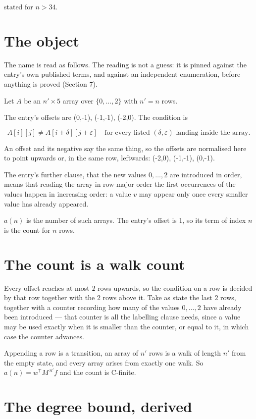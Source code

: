\documentclass[11pt]{article}
\theoremstyle{definition}
\begin{document}
stated for $n > 34$.

\section{The object}

The name is read as follows. The reading is not a guess: it is pinned against the entry's own published terms, and against an independent enumeration, before anything is proved (Section 7).

Let $A$ be an $n' \times 5$ array over $\{0,\dots,2\}$ with $n' = n$ rows.

The entry's offsets are (0,-1), (-1,-1), (-2,0). The condition is

\[A[i][j] \ne A[i{+}\delta][j{+}\varepsilon]\quad\text{for every listed }(\delta,\varepsilon)\text{ landing inside the array.}\]

An offset and its negative say the same thing, so the offsets are normalised here to point upwards or, in the same row, leftwards: (-2,0), (-1,-1), (0,-1).

The entry's further clause, that the new values $0,\dots,2$ are introduced in order, means that reading the array in row-major order the first occurrences of the values happen in increasing order: a value $v$ may appear only once every smaller value has already appeared.

$a(n)$ is the number of such arrays. The entry's offset is 1, so its term of index $n$ is the count for $n$ rows.

\section{The count is a walk count}

Every offset reaches at most $2$ rows upwards, so the condition on a row is decided by that row together with the $2$ rows above it. Take as state the last $2$ rows, together with a counter recording how many of the values $0,\dots,2$ have already been introduced --- that counter is all the labelling clause needs, since a value may be used exactly when it is smaller than the counter, or equal to it, in which case the counter advances.

Appending a row is a transition, an array of $n'$ rows is a walk of length $n'$ from the empty state, and every array arises from exactly one walk. So $a(n) = w^{\mathsf T}M^{\,n'}f$ and the count is C-finite.

\section{The degree bound, derived}
\end{document}
